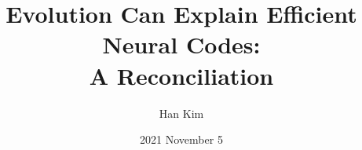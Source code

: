 \documentclass[twocolumn]{article}
\begin{document}
\title{Evolution Can Explain Efficient Neural Codes: \\A Reconciliation}
\author{Han Kim } 
\date{2021 November 5}




\end{document}

